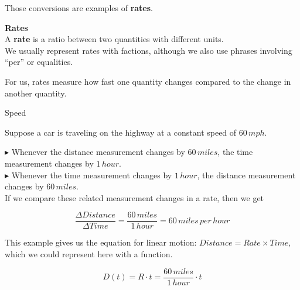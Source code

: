 \documentclass{ximera}
\begin{document}
Those conversions are examples of \textbf{rates}. 








\begin{definition} \textbf{\textcolor{green!50!black}{Rates}} \\

A \textbf{rate} is a ratio between two quantities with different units.   \\



We usually represent rates with factions, although we also use phrases involving ``per'' or equalities.

\end{definition}


For us, rates measure how fast one quantity changes compared to the change in another quantity.











\begin{example} Speed


Suppose a car is traveling on the highway at a constant speed of $60 \, mph$.


$\blacktriangleright$ Whenever the distance measurement changes by $60 \, miles$, the time measurement changes by $1 \, hour$. \\
$\blacktriangleright$ Whenever the time measurement changes by $1 \, hour$, the distance measurement changes by $60 \, miles$. \\




If we compare these related measurement changes in a rate, then we get

\[
\frac{\Delta Distance}{\Delta Time} = \frac{60 \, miles}{1 \, hour} = 60 \,miles \, per \, hour
\]


\end{example} 



This example gives us the equation for linear motion: $Distance = Rate \times Time$, which we could represent here with a function.

\[
D(t) = R \cdot t =  \frac{60 \, miles}{1 \, hour} \cdot t
\]
\end{document}
